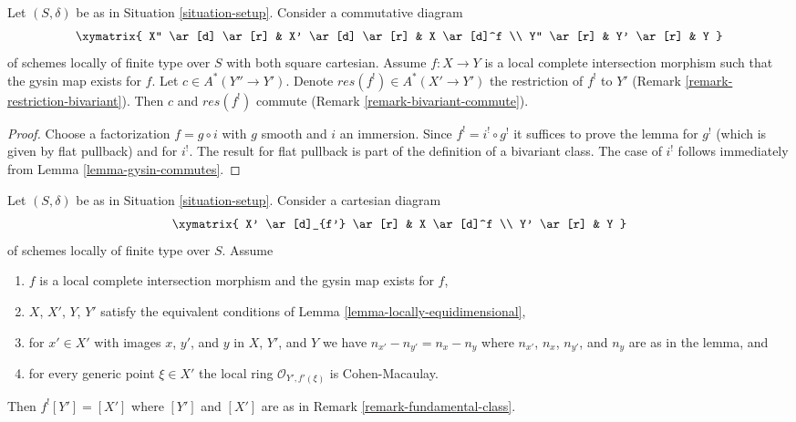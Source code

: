\begin{lemma}
\label{lemma-lci-gysin-commutes}
Let $(S, \delta)$ be as in Situation \ref{situation-setup}.
Consider a commutative diagram
$$
\xymatrix{
X'' \ar[d] \ar[r] &
X' \ar[d] \ar[r] &
X \ar[d]^f \\
Y'' \ar[r] &
Y' \ar[r] &
Y
}
$$
of schemes locally of finite type over $S$ with both square cartesian.
Assume $f : X \to Y$ is a local complete intersection morphism
such that the gysin map exists for $f$. Let $c \in A^*(Y'' \to Y')$. Denote
$res(f^!) \in A^*(X' \to Y')$ the restriction of $f^!$ to $Y'$
(Remark \ref{remark-restriction-bivariant}). Then $c$ and $res(f^!)$ commute
(Remark \ref{remark-bivariant-commute}).
\end{lemma}

\begin{proof}
Choose a factorization $f = g \circ i$ with $g$ smooth and $i$ an immersion.
Since $f^! = i^! \circ g^!$ it suffices to prove the lemma for $g^!$
(which is given by flat pullback) and for $i^!$. The result for flat pullback
is part of the definition of a bivariant class. The case of $i^!$ follows
immediately from Lemma \ref{lemma-gysin-commutes}.
\end{proof}

\begin{lemma}
\label{lemma-lci-gysin-easy}
Let $(S, \delta)$ be as in Situation \ref{situation-setup}.
Consider a cartesian diagram
$$
\xymatrix{
X' \ar[d]_{f'} \ar[r] &
X \ar[d]^f \\
Y' \ar[r] &
Y
}
$$
of schemes locally of finite type over $S$. Assume
\begin{enumerate}
\item $f$ is a local complete intersection morphism and
the gysin map exists for $f$,
\item $X$, $X'$, $Y$, $Y'$ satisfy the equivalent conditions of
Lemma \ref{lemma-locally-equidimensional},
\item for $x' \in X'$ with images $x$, $y'$, and $y$
in $X$, $Y'$, and $Y$ we have $n_{x'} - n_{y'} = n_x - n_y$
where $n_{x'}$, $n_x$, $n_{y'}$, and $n_y$ are as in the lemma, and
\item for every generic point $\xi \in X'$ the local ring
$\mathcal{O}_{Y', f'(\xi)}$ is Cohen-Macaulay.
\end{enumerate}
Then $f^![Y'] = [X']$ where $[Y']$ and $[X']$ are as in
Remark \ref{remark-fundamental-class}.
\end{lemma}

